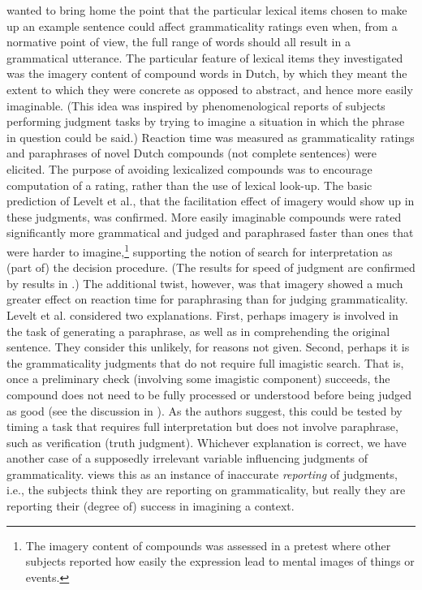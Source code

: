 \citet{LeveltEtAl1977} wanted to bring home the point that the particular lexical items chosen to make up an example sentence could affect grammaticality
ratings even when, from a normative point of view, the full range of words should all result in a grammatical utterance. The particular feature of lexical items they investigated was the imagery content of compound words in Dutch, by which they meant the extent to which they were concrete as opposed to abstract, and hence more easily imaginable. (This idea was inspired by phenomenological reports of subjects performing judgment tasks by trying to imagine a situation in which the phrase in question could be said.) Reaction time was measured as grammaticality ratings and paraphrases of novel Dutch compounds (not complete sentences) were elicited. The purpose of avoiding lexicalized compounds was to encourage computation of a rating, rather than the use of lexical look-up. The basic prediction of Levelt et al., that the facilitation effect of imagery would show up in these judgments, was confirmed. More easily imaginable compounds were rated significantly more grammatical and judged and paraphrased faster than ones that were harder to imagine,\footnote{The imagery content of compounds was assessed in a pretest where other subjects reported how easily the expression lead to mental images of things or events.}
 supporting the notion of search for interpretation as (part of) the decision procedure. (The results for speed of judgment are confirmed by results in \citet{GrantEtAl1977}.)
 The additional twist, however, was that imagery showed a much greater effect on reaction time for paraphrasing than for judging grammaticality. Levelt et al. considered two explanations. First, perhaps imagery is involved in the task of generating a paraphrase, as well as in comprehending the original sentence. They consider this unlikely, for reasons not given. Second, perhaps it is the grammaticality judgments that do not require full imagistic search. That is, once a preliminary check (involving some imagistic component) succeeds, the compound does not need to be fully processed or understood before being judged as good (see the discussion in ). As the authors suggest, this could be tested by timing a task that requires full interpretation but does not involve paraphrase, such as verification (truth judgment). Whichever explanation is correct, we have another case of a supposedly irrelevant variable influencing judgments of grammaticality. \citet{McCawley1985} views this as an instance of inaccurate \textit{reporting} of judgments, i.e., the subjects think they are reporting on grammaticality, but really they are reporting their (degree of) success in imagining a context.

